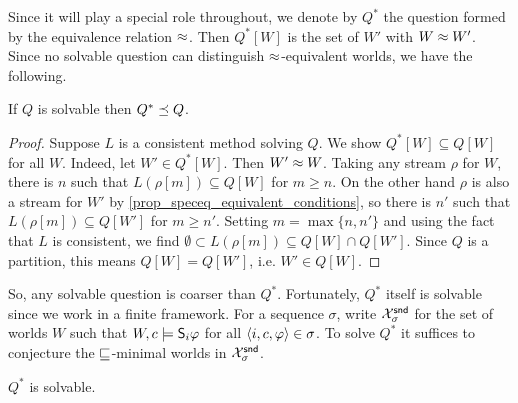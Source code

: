 Since it will play a special role throughout, we denote by $Q^*$ the question
formed by the equivalence relation $\speceq$. Then $Q^*[W]$ is the set of $W'$
with $W \speceq W'$. Since no solvable question can distinguish
$\speceq$-equivalent worlds, we have the following.

\begin{lemma}
    \label{lemma_solvable_implies_coarser_than_qstar}
    If $Q$ is solvable then $Q^* \refines Q$.
\end{lemma}

\begin{proof}
    Suppose $L$ is a consistent method solving $Q$. We show $Q^*[W] \subseteq
    Q[W]$ for all $W$.  Indeed, let $W' \in Q^*[W]$. Then $W' \speceq W$.
    Taking any stream $\rho$ for $W$, there is $n$ such that $L(\rho[m])
    \subseteq Q[W]$ for $m \ge n$. On the other hand $\rho$ is also a stream
    for $W'$ by \cref{prop_speceq_equivalent_conditions}, so there is $n'$ such
    that $L(\rho[m]) \subseteq Q[W']$ for $m \ge n'$. Setting $m = \max\{n,
    n'\}$ and using the fact that $L$ is consistent, we find $\emptyset \subset
    L(\rho[m]) \subseteq Q[W] \cap Q[W']$. Since $Q$ is a partition, this means
    $Q[W] = Q[W']$, i.e. $W' \in Q[W]$.
\end{proof}

So, any solvable question is coarser than $Q^*$. Fortunately, $Q^*$ itself is
solvable since we work in a finite framework. For a sequence $\sigma$, write
$\Xsnd_\sigma$ for the set of worlds $W$ such that $W, c \models \S_i\phi$ for
all $\tuple{i, c, \phi} \in \sigma$. To solve $Q^*$ it suffices to conjecture
the $\specleq$-minimal worlds in $\Xsnd_\sigma$.

\begin{proposition}
    \label{prop_qstar_solvable}
    $Q^*$ is solvable.
\end{proposition}

